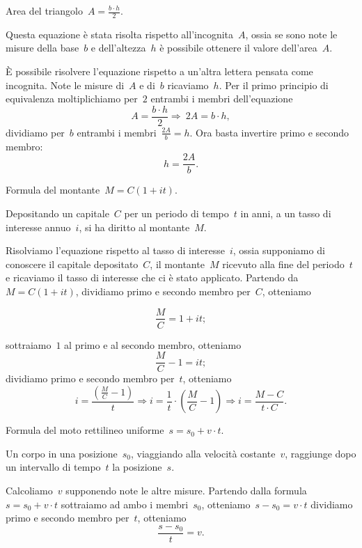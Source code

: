 \begin{exrig}
 \begin{esempio}
Area del triangolo~$A=\frac{b\cdot h}{2}$.

Questa equazione è stata risolta rispetto all'incognita~$A$, ossia se sono 
note le misure della base~$b$ e dell'altezza~$h$
è possibile ottenere il valore dell'area~$A$.

È possibile risolvere l'equazione rispetto a un'altra lettera pensata come 
incognita.
Note le misure di~$A$ e di~$b$ ricaviamo~$h$. Per il primo principio di 
equivalenza moltiplichiamo per~$2$
entrambi i membri dell'equazione
\[A=\frac{b\cdot h}{2}\Rightarrow~2A=b\cdot h,\]
dividiamo per~$b$ entrambi i membri~$\frac{2A}{b}=h$.
Ora basta invertire primo e secondo membro: \[h=\frac{2A}{b}.\]
 \end{esempio}

 \begin{esempio}
Formula del montante~$M=C(1+it)$.

Depositando un capitale~$C$ per un periodo di tempo~$t$ in anni, a un tasso di 
interesse annuo~$i$,
si ha diritto al montante~$M$.

Risolviamo l'equazione rispetto al tasso di interesse~$i$, ossia supponiamo di 
conoscere il capitale depositato~$C$, il montante~$M$
ricevuto alla fine del periodo~$t$ e ricaviamo il tasso di interesse che ci è 
stato applicato.
Partendo da~$M=C(1+it)$, dividiamo primo e secondo membro per~$C$, otteniamo 

\[\frac{M}{C}=1+it;\]

sottraiamo~$1$ al primo e al secondo membro, otteniamo
\[\frac{M}{C}-1=it;\] dividiamo primo e secondo membro per~$t$,
otteniamo
\[i=\frac{\left(\frac{M}{C}-1\right)}{t}\Rightarrow%
i=\frac{1}{t}\cdot \left(\frac{M}{C}-1\right)\Rightarrow 
i=\frac{M-C}{t\cdot C}.\]
 \end{esempio}

 \begin{esempio}
Formula del moto rettilineo uniforme~$s=s_{0}+v\cdot t$.

Un corpo in una posizione~$s_0$, viaggiando alla velocità costante~$v$, 
raggiunge dopo un intervallo di tempo~$t$ la posizione~$s$.

Calcoliamo~$v$ supponendo note le altre misure.
Partendo dalla formula~$s=s_{0}+v\cdot t$ sottraiamo ad ambo i membri~$s_0$, 
otteniamo~$s-s_{0}=v\cdot t$
dividiamo primo e secondo membro per~$t$, otteniamo \[\frac{s-s_{0}}{t}=v.\]
 \end{esempio}

\end{exrig}

